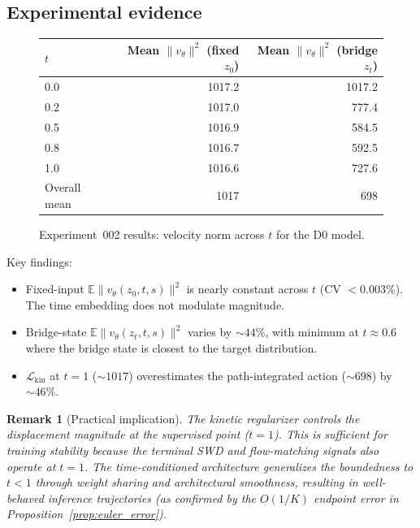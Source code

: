\documentclass[letterpaper]{article}
\newtheorem{remark}[proposition]{Remark}
\newcommand{\E}{\mathbb{E}}
\newcommand{\cL}{\mathcal{L}}
\begin{document}
\subsection{Experimental evidence}

\begin{figure}[h]
\centering
\begin{tabular}{lrr}
\toprule
$t$ & Mean $\|v_\theta\|^2$ (fixed $z_0$) & Mean $\|v_\theta\|^2$ (bridge $z_t$) \\
\midrule
0.0 & 1017.2 & 1017.2 \\
0.2 & 1017.0 & 777.4 \\
0.5 & 1016.9 & 584.5 \\
0.8 & 1016.7 & 592.5 \\
1.0 & 1016.6 & 727.6 \\
\midrule
Overall mean & 1017 & 698 \\
\bottomrule
\end{tabular}
\caption{Experiment~002 results: velocity norm across $t$ for the D0 model.}
\label{fig:t_dependence}
\end{figure}

Key findings:
\begin{itemize}[nosep]
    \item Fixed-input $\E\|v_\theta(z_0,t,s)\|^2$ is nearly constant across
    $t$ (CV $<0.003\%$). The time embedding does not modulate magnitude.
    \item Bridge-state $\E\|v_\theta(z_t,t,s)\|^2$ varies by $\sim 44\%$,
    with minimum at $t\approx 0.6$ where the bridge state is closest to
    the target distribution.
    \item $\cL_{\text{kin}}$ at $t=1$ ($\sim 1017$) overestimates the
    path-integrated action ($\sim 698$) by $\sim 46\%$.
\end{itemize}

\begin{remark}[Practical implication]
The kinetic regularizer controls the displacement magnitude at the
supervised point ($t=1$). This is sufficient for training stability
because the terminal SWD and flow-matching signals also operate at $t=1$.
The time-conditioned architecture generalizes the boundedness to $t<1$
through weight sharing and architectural smoothness, resulting in
well-behaved inference trajectories (as confirmed by the $O(1/K)$
endpoint error in Proposition~\ref{prop:euler_error}).
\end{remark}


\end{document}
